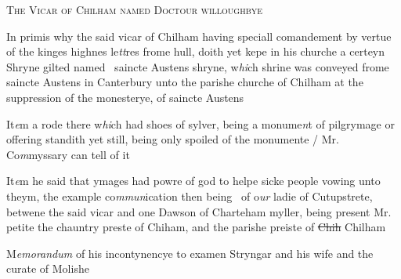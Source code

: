 \documentclass[12pt, a4paper]{book}
\begin{document}
	
				\begin{center} \begin{large} {\scshape The Vicar of Chilham named
 Doctour willoughbye} \end{large} \end{center}
			

	
		
				\marginpar[\vspace{0.5cm}{\textcolor{Gray}{a Shryne}}]{}
			
		
				\marginpar[\vspace{0.5cm}{\textcolor{Gray}{n}}]{}
			
		
		\ifthenelse{\isodd{\thepage}}
		{\reversemarginpar}
		{\normalmarginpar}
		In primis why the said vicar of Chilham having speciall
 comandement by vertue of the kinges highnes le\textit{tt}res frome hull,
 doith yet kepe in his churche a certeyn Shryne gilted named 
 saincte Austens shryne, w\textit{hi}ch shrine was conveyed frome saincte
			Austens in Canterbury unto the parishe churche of Chilham at
 the suppression of the monesterye, of saincte Austens
	
				\marginpar[\vspace{0.5cm}{\textcolor{Gray}{Images}}]{}
			
		\ifthenelse{\isodd{\thepage}}
		{\reversemarginpar}
		{\normalmarginpar}
		It\textit{e}m a rode there w\textit{hi}ch had shoes of sylver, being a monume\textit{n}t
 of pilgrymage or offering standith yet still, being only
 spoiled of the monumente / Mr. Co\textit{m}myssary can tell of it
 
 	
				\marginpar[\vspace{0.5cm}{\textcolor{Gray}{Images}}]{}
			
 	
		\ifthenelse{\isodd{\thepage}}
		{\reversemarginpar}
		{\normalmarginpar}
		It\textit{e}m he said that ymages had powre of god to helpe sicke
 people vowing unto theym, the example co\textit{mmun}ication then being 
 		of o\textit{ur} ladie of Cutupstrete, betwene the said vicar and one
 			Dawson of Charteham myller, being present Mr. petite
 the chauntry preste of Chiham, and the parishe preiste of
 \sout{Chih} Chilham
 
			
		\ifthenelse{\isodd{\thepage}}
		{\reversemarginpar}
		{\normalmarginpar}
		M\textit{emorandum} of his incontynencye to examen Stryngar and his wife
 	and the curate of Molishe
 	
\end{document}
